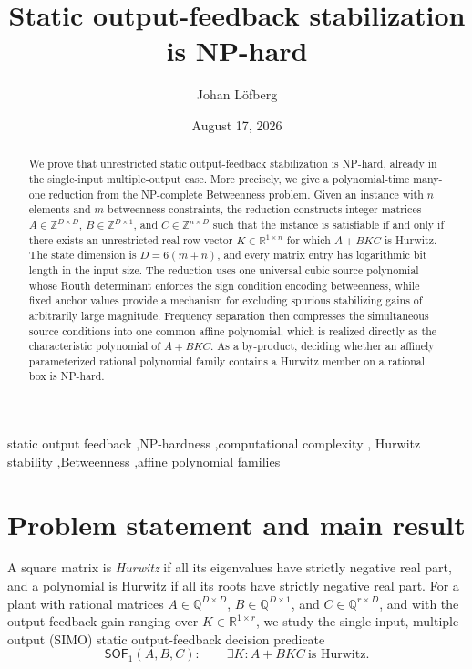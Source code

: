 \documentclass[final,5p,times,twocolumn]{elsarticle}
\newcommand{\R}{\mathbb R}
\newcommand{\Q}{\mathbb Q}
\begin{document}
\begin{frontmatter}
\title{Static output-feedback stabilization is NP-hard}
\author{Johan L\"ofberg}
\address{Division of Automatic Control\\Link\"oping University, Sweden
(e-mail: \texttt{johan.lofberg@liu.se})}
\date{August 17, 2026}

\begin{abstract}
We prove that unrestricted static output-feedback stabilization is NP-hard, already in the single-input multiple-output case. More precisely, we give a polynomial-time many-one reduction from the NP-complete Betweenness problem. Given an instance with $n$ elements and $m$ betweenness constraints, the reduction constructs integer matrices
$A\in\mathbb Z^{D\times D}$, $B\in\mathbb Z^{D\times1}$, and $C\in\mathbb Z^{n\times D}$ such that the instance is satisfiable if and only if there exists an unrestricted real row vector $K\in\R^{1\times n}$ for which $A+BKC$ is Hurwitz. The state dimension is $D=6(m+n)$, and every matrix entry has logarithmic bit length in the input size. The reduction uses one universal cubic source polynomial whose Routh determinant enforces the sign condition encoding betweenness, while fixed anchor values provide a mechanism for excluding spurious stabilizing gains of arbitrarily large magnitude. Frequency separation then compresses the simultaneous source conditions into one common affine polynomial, which is realized directly as the characteristic polynomial of $A+BKC$. As a by-product, deciding whether an affinely parameterized rational polynomial family contains a Hurwitz member on a rational box is NP-hard.
\end{abstract}
\begin{keyword}
static output feedback \sep NP-hardness \sep computational complexity \sep
Hurwitz stability \sep Betweenness \sep affine polynomial families
\end{keyword}
\end{frontmatter}

\section{Problem statement and main result}\label{sec:problem}

A square matrix is \emph{Hurwitz} if all its eigenvalues have strictly negative real part, and a polynomial is Hurwitz if all its roots have strictly negative real part. For a plant with rational matrices $A\in\Q^{D\times D}$, $B\in\Q^{D\times1}$, and $C\in\Q^{r\times D}$, and with the output feedback gain ranging over $K\in\R^{1\times r}$, we study the single-input, multiple-output (SIMO) static output-feedback decision predicate
\[
\mathsf{SOF}_{1}(A,B,C):\qquad
\exists K\colon A+BKC\ \text{is Hurwitz}.
\]
\end{document}
